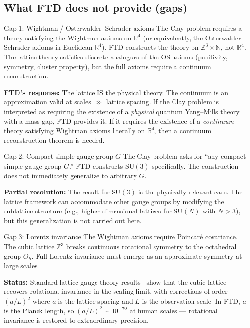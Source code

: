 \documentclass[11pt]{article}
\theoremstyle{tight}
\theoremstyle{plainroman}
\newcommand{\R}{\mathbb{R}}
\newcommand{\Z}{\mathbb{Z}}
\newcommand{\N}{\mathbb{N}}
\begin{document}
\subsection{What FTD does not provide (gaps)}

\begin{statusbox}{Gap 1: Wightman / Osterwalder--Schrader axioms}
The Clay problem requires a theory satisfying the Wightman axioms on $\R^4$ (or equivalently, the Osterwalder--Schrader axioms in Euclidean $\R^4$).
FTD constructs the theory on $\Z^3\times\N$, not $\R^4$.
The lattice theory satisfies discrete analogues of the OS axioms (positivity, symmetry, cluster property), but the full axioms require a continuum reconstruction.

\textbf{FTD's response:} The lattice IS the physical theory.
The continuum is an approximation valid at scales $\gg$ lattice spacing.
If the Clay problem is interpreted as requiring the existence of a \emph{physical} quantum Yang--Mills theory with a mass gap, FTD provides it.
If it requires the existence of a \emph{continuum} theory satisfying Wightman axioms literally on $\R^4$, then a continuum reconstruction theorem is needed.
\end{statusbox}

\begin{statusbox}{Gap 2: Compact simple gauge group $G$}
The Clay problem asks for ``any compact simple gauge group $G$.''
FTD constructs $\mathrm{SU}(3)$ specifically.
The construction does not immediately generalize to arbitrary $G$.

\textbf{Partial resolution:} The result for $\mathrm{SU}(3)$ is the physically relevant case.
The lattice framework can accommodate other gauge groups by modifying the sublattice structure (e.g., higher-dimensional lattices for $\mathrm{SU}(N)$ with $N>3$), but this generalization is not carried out here.
\end{statusbox}

\begin{statusbox}{Gap 3: Lorentz invariance}
The Wightman axioms require Poincar\'e covariance.
The cubic lattice $\Z^3$ breaks continuous rotational symmetry to the octahedral group $O_h$.
Full Lorentz invariance must emerge as an approximate symmetry at large scales.

\textbf{Status:} Standard lattice gauge theory results~\cite{wilson,creutz} show that the cubic lattice recovers rotational invariance in the scaling limit, with corrections of order $(a/L)^2$ where $a$ is the lattice spacing and $L$ is the observation scale.
In FTD, $a$ is the Planck length, so $(a/L)^2\sim 10^{-70}$ at human scales --- rotational invariance is restored to extraordinary precision.
\end{statusbox}
\end{document}

